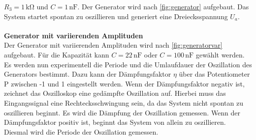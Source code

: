 $R_3=1\,\unit{\kilo\ohm}$ und $C=1\,\text{nF}$. Der Generator wird nach \autoref{fig:generator} aufgebaut. 
Das System startet spontan zu oszillieren und generiert eine Dreiecksspannung $U_a$.\\
\\
\textbf{Generator mit variierenden Amplituden}\\
Der Generator mit variierenden Amplituden wird nach \autoref{fig:generatorvar} aufgebaut. Für die Kapazität kann $C=22\,\text{nF}$ oder 
$C=100\,\text{nF}$ gewählt werden. Es werden nun experimentell die Periode und die Umlaufdauer 
der Oszillation des Generators bestimmt. Dazu kann der Dämpfungsfaktor $\eta$ über das Potentiometer P zwischen -1 und 1 
eingestellt werden. Wenn der Dämpfungsfaktor negativ ist, zeichnet das Oszilloskop eine gedämpfte Oszillation auf. Hierbei muss das Eingangssignal 
eine Rechtecksschwingung sein, da das System nicht spontan zu oszillieren beginnt. Es wird die Dämpfung der Oszillation gemessen.
Wenn der Dämpfungsfaktor positiv ist, beginnt das System von allein zu oszillieren. Diesmal wird die Periode der Oszillation gemessen. 
